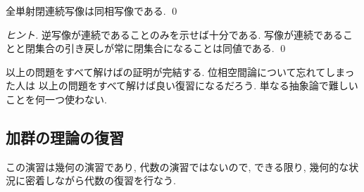 \documentclass[12pt,twoside]{jarticle}
\begin{document}
\begin{question}
  全単射閉連続写像は同相写像である. \qed
\end{question}

\begin{proof}[ヒント]
  逆写像が連続であることのみを示せば十分である.
  写像が連続であることと閉集合の引き戻しが常に閉集合になることは同値である.
  \qed
\end{proof}

以上の問題をすべて解けばの証明が完結する.
位相空間論について忘れてしまった人は
以上の問題をすべて解けば良い復習になるだろう.
単なる抽象論で難しいことを何一つ使わない.



\subsection{加群の理論の復習}
\label{sec:kagun}

この演習は幾何の演習であり, 代数の演習ではないので,
できる限り, 幾何的な状況に密着しながら代数の復習を行なう.
\end{document}
